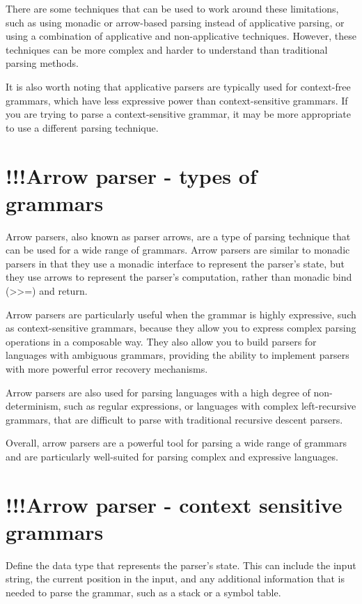 \documentclass[12pt,twoside]{report}
\begin{document}
There are some techniques that can be used to work around these limitations, such as using monadic or arrow-based parsing instead of applicative parsing, or using a combination of applicative and non-applicative techniques. However, these techniques can be more complex and harder to understand than traditional parsing methods.

It is also worth noting that applicative parsers are typically used for context-free grammars, which have less expressive power than context-sensitive grammars. If you are trying to parse a context-sensitive grammar, it may be more appropriate to use a different parsing technique.

\section{!!!Arrow parser - types of grammars}
Arrow parsers, also known as parser arrows, are a type of parsing technique that can be used for a wide range of grammars. Arrow parsers are similar to monadic parsers in that they use a monadic interface to represent the parser's state, but they use arrows to represent the parser's computation, rather than monadic bind (>>=) and return.

Arrow parsers are particularly useful when the grammar is highly expressive, such as context-sensitive grammars, because they allow you to express complex parsing operations in a composable way. They also allow you to build parsers for languages with ambiguous grammars, providing the ability to implement parsers with more powerful error recovery mechanisms.

Arrow parsers are also used for parsing languages with a high degree of non-determinism, such as regular expressions, or languages with complex left-recursive grammars, that are difficult to parse with traditional recursive descent parsers.

Overall, arrow parsers are a powerful tool for parsing a wide range of grammars and are particularly well-suited for parsing complex and expressive languages.

\section{!!!Arrow parser - context sensitive grammars}
Define the data type that represents the parser's state. This can include the input string, the current position in the input, and any additional information that is needed to parse the grammar, such as a stack or a symbol table.
\end{document}
